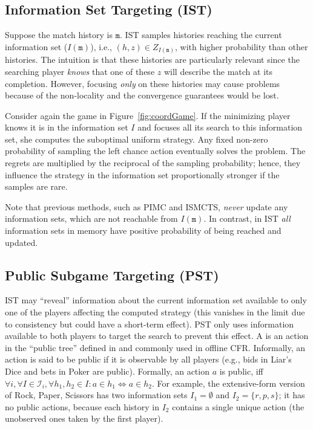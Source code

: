 \documentclass{aamas2015}
\newcommand{\cI}{\mathcal{I}}
\newcommand{\ttm}{\mathtt{m}}
\newcommand{\defword}[1]{\textbf{\boldmath{#1}}}
\begin{document}
\subsection{Information Set Targeting (IST)}

Suppose the match history is $\ttm$. IST samples histories reaching the current information set ($I(\ttm)$), 
i.e., $(h,z) \in Z_{I(\ttm)}$, with higher probability than other histories.
The intuition is that these histories are particularly 
relevant since the searching player {\it knows} that one of these $z$ will describe the match at its completion. 
However, focusing {\it only} on these histories may cause problems because of the non-locality and the convergence guarantees would be lost.

Consider again the game in Figure~\ref{fig:coordGame}. 
If the minimizing player knows it is in the information set $I$ and focuses all its search to this information set, she computes the suboptimal uniform strategy.
Any fixed non-zero probability of sampling the left chance action 
eventually solves the problem. The regrets are multiplied by the reciprocal of the sampling probability; hence, they influence the strategy 
in the information set proportionally stronger if the samples are rare.

Note that previous methods, such as PIMC and ISMCTS, {\it never} update any information sets, which are not reachable from $I(\ttm)$. In contrast, in IST {\it all} information sets in memory have positive probability of being reached and updated.


\subsection{Public Subgame Targeting (PST)}

IST may ``reveal'' information about the current information set available to only one of the players affecting the computed strategy (this vanishes in the limit due to consistency but could have a short-term effect). PST only uses information available to both players to target the search to prevent this effect.
A \defword{public action} is an action in the ``public tree'' defined in \cite{12aamas-pcs} and commonly used in offline CFR. Informally, an action is said to be public if it is observable by all players (e.g., bids in Liar's Dice and bets in Poker are public). Formally, an action $a$ is public, iff 
$\forall i, \forall I \in \cI_i, \forall h_1,h_2\in I: a\in h_1 \Leftrightarrow a\in h_2$.
For example, the extensive-form version of Rock, Paper, Scissors has two information 
sets $I_1 = \emptyset$ and $I_2 = \{ r, p, s \}$; it has no public actions, because each history in 
$I_2$ contains a single unique action (the unobserved ones taken by the first player). 
\end{document}
